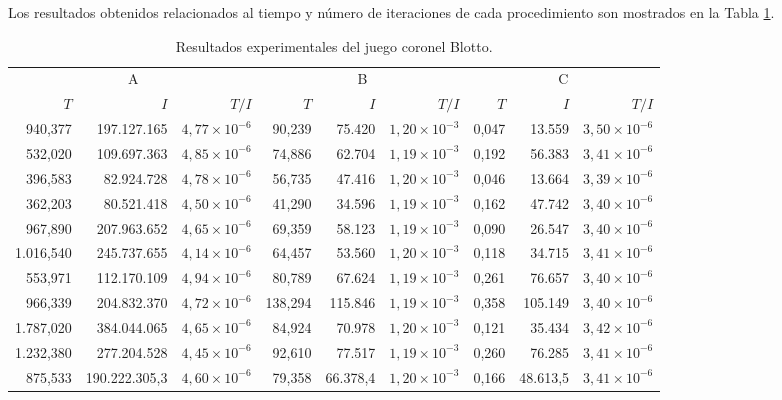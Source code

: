 Los resultados obtenidos relacionados al tiempo y número de iteraciones de cada procedimiento son mostrados en la Tabla \ref{tab:resultados-coronel-blotto}.

\begin{table}[h]
    \centering
    \caption{Resultados experimentales del juego coronel Blotto.}
    \label{tab:resultados-coronel-blotto}
    \scriptsize
    \begin{tabular}{r r r r r r r r r}
    \toprule
    \multicolumn{3}{c}{A} & \multicolumn{3}{c}{B} & \multicolumn{3}{c}{C} \\ \cmidrule(r){1-3} \cmidrule(lr){4-6} \cmidrule(l){7-9}
    $T$ & $I$ & $T/I$ & $T$ & $I$ & $T/I$ & $T$ & $I$ & $T/I$ \\  \cmidrule(r){1-3} \cmidrule(lr){4-6} \cmidrule(l){7-9}
	  940,377 & 197.127.165   & $4,77 {\times} 10^{-6}$ &  90,239 &  75.420   & $1,20 {\times} 10^{-3}$ & 0,047 &  13.559   & $3,50 {\times} 10^{-6}$ \\
	  532,020 & 109.697.363   & $4,85 {\times} 10^{-6}$ &  74,886 &  62.704   & $1,19 {\times} 10^{-3}$ & 0,192 &  56.383   & $3,41 {\times} 10^{-6}$ \\
	  396,583 &  82.924.728   & $4,78 {\times} 10^{-6}$ &  56,735 &  47.416   & $1,20 {\times} 10^{-3}$ & 0,046 &  13.664   & $3,39 {\times} 10^{-6}$ \\
	  362,203 &  80.521.418   & $4,50 {\times} 10^{-6}$ &  41,290 &  34.596   & $1,19 {\times} 10^{-3}$ & 0,162 &  47.742   & $3,40 {\times} 10^{-6}$ \\
	  967,890 & 207.963.652   & $4,65 {\times} 10^{-6}$ &  69,359 &  58.123   & $1,19 {\times} 10^{-3}$ & 0,090 &  26.547   & $3,40 {\times} 10^{-6}$ \\
	1.016,540 & 245.737.655   & $4,14 {\times} 10^{-6}$ &  64,457 &  53.560   & $1,20 {\times} 10^{-3}$ & 0,118 &  34.715   & $3,41 {\times} 10^{-6}$ \\
	  553,971 & 112.170.109   & $4,94 {\times} 10^{-6}$ &  80,789 &  67.624   & $1,19 {\times} 10^{-3}$ & 0,261 &  76.657   & $3,40 {\times} 10^{-6}$ \\
	  966,339 & 204.832.370   & $4,72 {\times} 10^{-6}$ & 138,294 & 115.846   & $1,19 {\times} 10^{-3}$ & 0,358 & 105.149   & $3,40 {\times} 10^{-6}$ \\
	1.787,020 & 384.044.065   & $4,65 {\times} 10^{-6}$ &  84,924 &  70.978   & $1,20 {\times} 10^{-3}$ & 0,121 &  35.434   & $3,42 {\times} 10^{-6}$ \\
	1.232,380 & 277.204.528   & $4,45 {\times} 10^{-6}$ &  92,610 &  77.517   & $1,19 {\times} 10^{-3}$ & 0,260 &  76.285   & $3,41 {\times} 10^{-6}$ \\ \cmidrule(r){1-3} \cmidrule(lr){4-6} \cmidrule(l){7-9}
	  875,533 & 190.222.305,3 & $4,60 {\times} 10^{-6}$ &  79,358 &  66.378,4 & $1,20 {\times} 10^{-3}$ & 0,166 &  48.613,5 & $3,41 {\times} 10^{-6}$ \\ \bottomrule
    \end{tabular}
\end{table}

